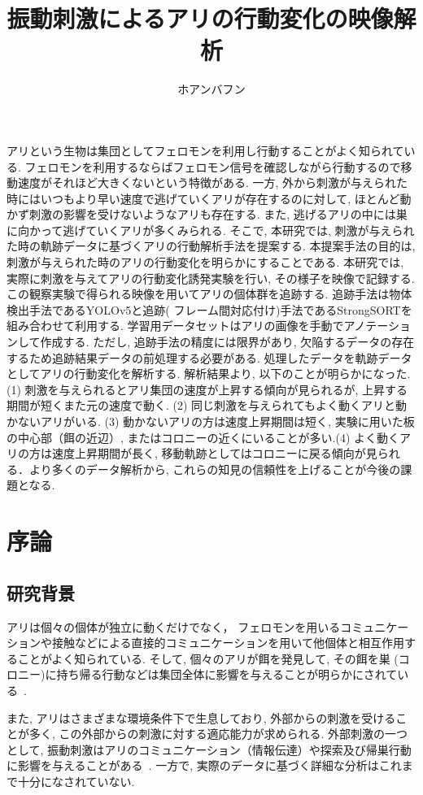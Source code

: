 ﻿\documentclass[a4paper, 12pt]{jsreport}
\title{振動刺激によるアリの行動変化の映像解析}
\author{ホアンバフン}
\begin{document}
\beforepreface

アリという生物は集団としてフェロモンを利用し行動することがよく知られている. フェロモンを利用するならばフェロモン信号を確認しながら行動するので移動速度がそれほど大きくないという特徴がある. 一方, 外から刺激が与えられた時にはいつもより早い速度で逃げていくアリが存在するのに対して, ほとんど動かず刺激の影響を受けないようなアリも存在する. また, 逃げるアリの中には巣に向かって逃げていくアリが多くみられる. そこで, 本研究では, 刺激が与えられた時の軌跡データに基づくアリの行動解析手法を提案する. 本提案手法の目的は, 刺激が与えられた時のアリの行動変化を明らかにすることである. 本研究では, 実際に刺激を与えてアリの行動変化誘発実験を行い, その様子を映像で記録する. この観察実験で得られる映像を用いてアリの個体群を追跡する. 追跡手法は物体検出手法であるYOLOv5と追跡( フレーム間対応付け)手法であるStrongSORTを組み合わせて利用する. 学習用データセットはアリの画像を手動でアノテーションして作成する. ただし, 追跡手法の精度には限界があり, 欠陥するデータの存在するため追跡結果データの前処理する必要がある. 処理したデータを軌跡データとしてアリの行動変化を解析する. 解析結果より, 以下のことが明らかになった. (1) 刺激を与えられるとアリ集団の速度が上昇する傾向が見られるが, 上昇する期間が短くまた元の速度で動く. (2) 同じ刺激を与えられてもよく動くアリと動かないアリがいる. (3) 動かないアリの方は速度上昇期間は短く, 実験に用いた板の中心部（餌の近辺）, またはコロニーの近くにいることが多い.(4) よく動くアリの方は速度上昇期間が長く, 移動軌跡としてはコロニーに戻る傾向が見られる．より多くのデータ解析から, これらの知見の信頼性を上げることが今後の課題となる. 
\afterpreface
\chapter{序論}

\section{研究背景}
\label{sec:background}

アリは個々の個体が独立に動くだけでなく， フェロモンを用いるコミュニケーションや接触などによる直接的コミュニケーションを用いて他個体と相互作用することがよく知られている\cite{1}. そして, 個々のアリが餌を発見して, その餌を巣 (コロニー)に持ち帰る行動などは集団全体に影響を与えることが明らかにされている~\cite{2}. 

また, アリはさまざまな環境条件下で生息しており, 外部からの刺激を受けることが多く, この外部からの刺激に対する適応能力が求められる. 外部刺激の一つとして, 振動刺激はアリのコミュニケーション（情報伝達）や探索及び帰巣行動に影響を与えることがある~\cite{3}. 一方で, 実際のデータに基づく詳細な分析はこれまで十分になされていない.
\end{document}
